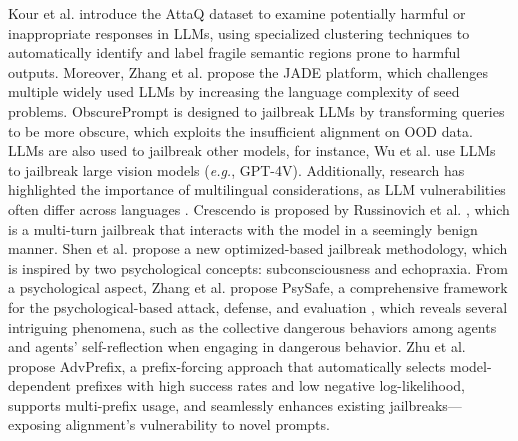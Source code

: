 Kour et al. \cite{kour2023unveiling} introduce the AttaQ dataset to examine potentially harmful or inappropriate responses in LLMs, using specialized clustering techniques to automatically identify and label fragile semantic regions prone to harmful outputs.
Moreover, Zhang et al. \cite{zhang2023jade} propose the JADE platform, which challenges multiple widely used LLMs by increasing the language complexity of seed problems. ObscurePrompt \cite{huang2024obscurepromptjailbreakinglargelanguage} is designed to jailbreak LLMs by transforming queries to be more obscure, which exploits the insufficient alignment on OOD data. LLMs are also used to jailbreak other models, for instance, Wu et al. \cite{wu2024largelanguagemodelsautomatically} use LLMs to jailbreak large vision models (\emph{e.g.}, GPT-4V). Additionally, research has highlighted the importance of multilingual considerations, as LLM vulnerabilities often differ across languages \cite{deng2023multilingual, cao2023cross}. Crescendo is proposed by Russinovich et al. \cite{russinovich2024great}, which is a multi-turn jailbreak that interacts with the model in a seemingly benign manner. Shen et al. \cite{shen2024rapid} propose a new optimized-based jailbreak methodology, which is inspired by two psychological concepts: subconsciousness and echopraxia. From a psychological aspect, Zhang et al. propose PsySafe, a comprehensive framework for the psychological-based attack, defense, and evaluation \cite{zhang2024psysafe}, which reveals several intriguing phenomena, such as the collective dangerous behaviors among agents and agents' self-reflection when engaging in dangerous behavior. Zhu et al. \cite{zhu2024advprefix} propose AdvPrefix, a prefix-forcing approach that automatically selects model-dependent prefixes with high success rates and low negative log-likelihood, supports multi-prefix usage, and seamlessly enhances existing jailbreaks—exposing alignment’s vulnerability to novel prompts.


